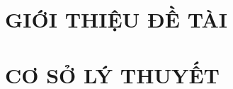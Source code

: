 \documentclass[a4paper,13pt,3p,twoside]{report}
\theoremstyle{definition}
\begin{document}
\renewcommand{\listfigurename}{DANH MỤC HÌNH VẼ}
{\let\oldnumberline\numberline
\renewcommand{\numberline}{Hình~\oldnumberline}
\listoffigures}
\newpage


\renewcommand{\listtablename}{DANH MỤC BẢNG BIỂU}
{\let\oldnumberline\numberline
\renewcommand{\numberline}{Bảng~\oldnumberline}
\listoftables}

\glsaddall
 \renewcommand*{\glossaryname}{Danh sách thuật ngữ}
\renewcommand*{\acronymname}{DANH MỤC THUẬT NGỮ VÀ TỪ VIẾT TẮT}
\renewcommand*{\entryname}{Thuật ngữ}
\renewcommand*{\descriptionname}{Ý nghĩa}
\renewcommand{\lstlistingname}{Đoạn mã} %



% 



\newpage
{}

\pagestyle{fancy}
\fancyhf{}
\fancyhead[RE, LO]{\leftmark}
\fancyfoot[RE, LO]{\thepage}

\chapter{GIỚI THIỆU ĐỀ TÀI}
\label{chapter:Introduction}

\newpage
\chapter{CƠ SỞ LÝ THUYẾT}
\label{chapter:Related_works}
\end{document}
